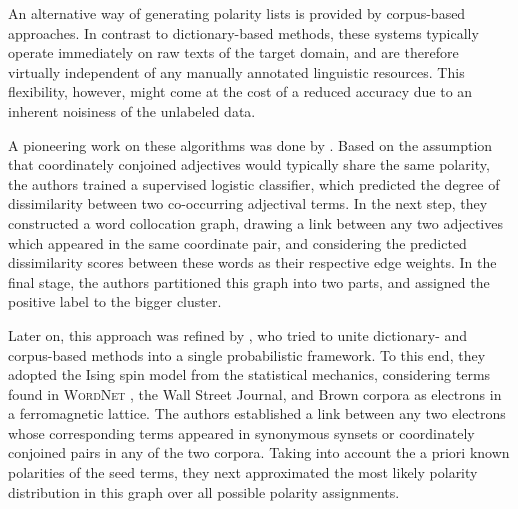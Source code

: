 An alternative way of generating polarity lists is provided by
corpus-based approaches.  In contrast to dictionary-based methods,
these systems typically operate immediately on raw texts of the target
domain, and are therefore virtually independent of any manually
annotated linguistic resources.  This flexibility, however, might come
at the cost of a reduced accuracy due to an inherent noisiness of the
unlabeled data.

A pioneering work on these algorithms was done by
\citet{Hatzivassi:97}.  Based on the assumption that coordinately
conjoined adjectives would typically share the same polarity, the
authors trained a supervised logistic classifier, which predicted the
degree of dissimilarity between two co-occurring adjectival terms.  In
the next step, they constructed a word collocation graph, drawing a
link between any two adjectives which appeared in the same coordinate
pair, and considering the predicted dissimilarity scores between these
words as their respective edge weights.  In the final stage, the
authors partitioned this graph into two parts, and assigned the
positive label to the bigger cluster.

Later on, this approach was refined by \citet{Takamura:05}, who tried
to unite dictionary- and corpus-based methods into a single
probabilistic framework.  To this end, they adopted the Ising spin
model from the statistical mechanics, considering terms found in
\textsc{WordNet} \cite{Miller:95}, the Wall Street Journal, and Brown
corpora as electrons in a ferromagnetic lattice.  The authors
established a link between any two electrons whose corresponding terms
appeared in synonymous synsets or coordinately conjoined pairs in any
of the two corpora.  Taking into account the a priori known polarities
of the seed terms, they next approximated the most likely polarity
distribution in this graph over all possible polarity assignments.


